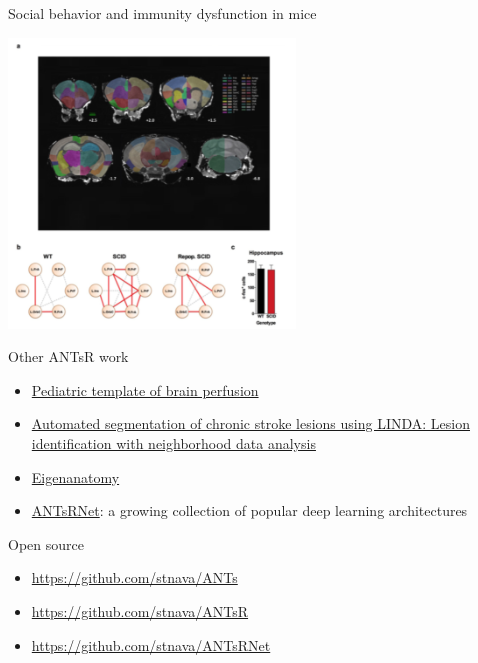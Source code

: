 \documentclass[ignorenonframetext,]{beamer}
\begin{document}
\begin{frame}{Social behavior and immunity dysfunction in mice}

\begin{centering}

\includegraphics[width=3in]{./antsr/figures/filiano_rsfmri.png}

\end{centering}

\end{frame}

\begin{frame}{Other ANTsR work}

\begin{itemize}
\item
  \href{http://www.nature.com/articles/sdata20153}{Pediatric template of
  brain perfusion}
\item
  \href{http://www.ncbi.nlm.nih.gov/pubmed/26756101}{Automated
  segmentation of chronic stroke lesions using LINDA: Lesion
  identification with neighborhood data analysis}
\item
  \href{http://www.ncbi.nlm.nih.gov/pubmed/25448483}{Eigenanatomy}
\item
  \href{https://github.com/stnava/ANTsRNet}{ANTsRNet}: a growing
  collection of popular deep learning architectures
\end{itemize}

\end{frame}

\begin{frame}{Open source}

\begin{itemize}
\item
  \url{https://github.com/stnava/ANTs}
\item
  \url{https://github.com/stnava/ANTsR}
\item
  \url{https://github.com/stnava/ANTsRNet}
\end{itemize}

\end{frame}
\end{document}
